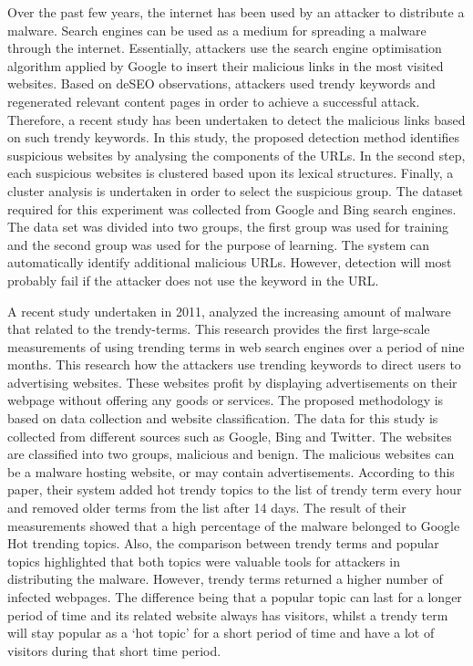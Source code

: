 
Over the past few years, the internet has been used by an attacker to distribute a malware. Search engines can be used as a medium for spreading a malware through the internet. Essentially, attackers use the search engine optimisation algorithm applied by Google to insert their malicious links in the most visited websites. Based on deSEO observations, attackers used trendy keywords and regenerated relevant content pages in order to achieve a successful attack.\cite{deSEO}
Therefore, a recent study has been undertaken to detect the malicious links based on such trendy keywords. In this study, the proposed detection method identifies suspicious websites by analysing the components of the URLs. In the second step, each suspicious websites is clustered based upon its lexical structures. Finally, a cluster analysis is undertaken in order to select the suspicious group.\cite{deSEO}
The dataset required for this experiment was collected from Google and Bing search engines. The data set was divided into two groups, the first group was used for training and the second group was used for the purpose of learning. The system can automatically identify additional malicious URLs. However, detection will most probably fail if the attacker does not use the keyword in the URL.\cite{deSEO}


A recent study undertaken in 2011, analyzed the increasing amount of malware that related to the trendy-terms. This research provides the first large-scale measurements of using trending terms in web search engines over a period of nine months. This research how the attackers use trending keywords to direct users to advertising websites. These websites profit by displaying advertisements on their webpage without offering any goods or services. \cite{moore2011fashion}
The proposed methodology is based on data collection and website classification. The data for this study is collected from different sources such as Google, Bing and Twitter. The websites are classified into two groups, malicious and benign. The malicious websites can be a malware hosting website, or may contain advertisements.\cite{moore2011fashion}
According to this paper, their system added hot trendy topics to the list of trendy term every hour and removed older terms from the list after 14 days. The result of their measurements showed that a high percentage of the malware belonged to Google Hot trending topics. Also, the comparison between trendy terms and popular topics highlighted that both topics were valuable tools for attackers in distributing the malware. However, trendy terms returned a higher number of infected webpages. The difference being that a popular topic can last for a longer period of time and its related website always has visitors, whilst a trendy term will stay popular as a ‘hot topic’ for a short period of time and have a lot of visitors during that short time period.\cite{moore2011fashion}

